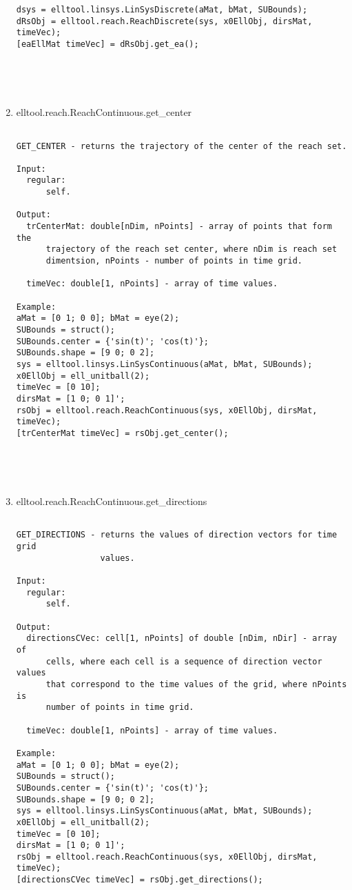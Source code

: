 \begin{enumerate}
\begin{lstlisting}
dsys = elltool.linsys.LinSysDiscrete(aMat, bMat, SUBounds);
dRsObj = elltool.reach.ReachDiscrete(sys, x0EllObj, dirsMat, timeVec);
[eaEllMat timeVec] = dRsObj.get_ea();





\end{lstlisting}
\fontfamily{\familydefault}
\selectfont
\item {elltool.reach.ReachContinuous.get\_center}
\selectfont
\begin{lstlisting}

GET_CENTER - returns the trajectory of the center of the reach set.

Input:
  regular:
      self.

Output:
  trCenterMat: double[nDim, nPoints] - array of points that form the
      trajectory of the reach set center, where nDim is reach set
      dimentsion, nPoints - number of points in time grid.

  timeVec: double[1, nPoints] - array of time values.

Example:
aMat = [0 1; 0 0]; bMat = eye(2);
SUBounds = struct();
SUBounds.center = {'sin(t)'; 'cos(t)'};
SUBounds.shape = [9 0; 0 2];
sys = elltool.linsys.LinSysContinuous(aMat, bMat, SUBounds);
x0EllObj = ell_unitball(2);
timeVec = [0 10];
dirsMat = [1 0; 0 1]';
rsObj = elltool.reach.ReachContinuous(sys, x0EllObj, dirsMat, timeVec);
[trCenterMat timeVec] = rsObj.get_center();





\end{lstlisting}
\fontfamily{\familydefault}
\selectfont
\item {elltool.reach.ReachContinuous.get\_directions}
\selectfont
\begin{lstlisting}

GET_DIRECTIONS - returns the values of direction vectors for time grid
                 values.

Input:
  regular:
      self.

Output:
  directionsCVec: cell[1, nPoints] of double [nDim, nDir] - array of
      cells, where each cell is a sequence of direction vector values
      that correspond to the time values of the grid, where nPoints is
      number of points in time grid.

  timeVec: double[1, nPoints] - array of time values.

Example:
aMat = [0 1; 0 0]; bMat = eye(2);
SUBounds = struct();
SUBounds.center = {'sin(t)'; 'cos(t)'};
SUBounds.shape = [9 0; 0 2];
sys = elltool.linsys.LinSysContinuous(aMat, bMat, SUBounds);
x0EllObj = ell_unitball(2);
timeVec = [0 10];
dirsMat = [1 0; 0 1]';
rsObj = elltool.reach.ReachContinuous(sys, x0EllObj, dirsMat, timeVec);
[directionsCVec timeVec] = rsObj.get_directions();






\end{lstlisting}
\end{enumerate}
